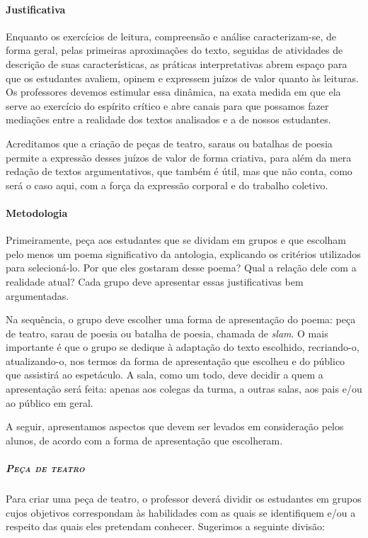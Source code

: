 \documentclass[11pt]{extarticle}
\begin{document}
\paragraph{Justificativa} Enquanto os exercícios de leitura, compreensão e
análise caracterizam-se, de forma geral, pelas primeiras aproximações do
texto, seguidas de atividades de descrição de suas características, as
práticas interpretativas abrem espaço para que os estudantes avaliem,
opinem e expressem juízos de valor quanto às leituras. Os professores
devemos estimular essa dinâmica, na exata medida em que ela serve ao
exercício do espírito crítico e abre canais para que possamos fazer
mediações entre a realidade dos textos analisados e a de nossos
estudantes.


Acreditamos que a criação de peças de teatro, saraus ou batalhas de
poesia permite a expressão desses juízos de valor de forma criativa,
para além da mera redação de textos argumentativos, que também é útil,
mas que não conta, como será o caso aqui, com a força da expressão
corporal e do trabalho coletivo.

\paragraph{Metodologia}

Primeiramente, peça aos estudantes que se dividam em grupos e que
escolham pelo menos um poema significativo da antologia, explicando os
critérios utilizados para selecioná-lo. Por que eles gostaram desse
poema? Qual a relação dele com a realidade atual? Cada grupo deve
apresentar essas justificativas bem argumentadas.

Na sequência, o grupo deve escolher uma forma de apresentação do poema:
peça de teatro, sarau de poesia ou batalha de poesia, chamada de
\emph{slam}. O mais importante é que o grupo se dedique à adaptação do
texto escolhido, recriando-o, atualizando-o, nos termos da forma de
apresentação que escolheu e do público que assistirá ao espetáculo. A
sala, como um todo, deve decidir a quem a apresentação será feita:
apenas aos colegas da turma, a outras salas, aos pais e/ou ao público em
geral.

A seguir, apresentamos aspectos que devem ser levados em consideração
pelos alunos, de acordo com a forma de apresentação que escolheram.

\subparagraph{\textsc{Peça de teatro}}

Para criar uma peça de teatro, o professor deverá dividir os
estudantes em grupos cujos objetivos correspondam às habilidades com as
quais se identifiquem e/ou a respeito das quais eles pretendam conhecer.
Sugerimos a seguinte divisão:
\end{document}
